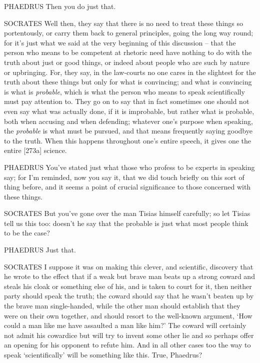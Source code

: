 PHAEDRUS Then you do just that. 

SOCRATES Well then, they say that there is no need to treat these things
so portentously, or carry them back to general principles, going the
long way round; for it's just what we said at the very beginning of this
discussion -- that the person who means to be competent at rhetoric need
have nothing to do  with the truth about just or good things, or
indeed about people who are such by nature or upbringing. For, they say,
in the law-courts no one cares in the slightest for the truth about
these things but only for what is convincing; and what is convincing
 is what is {\em probable}, which is what the person who means
to speak scientifically must pay attention to. They go on to say that in
fact sometimes one should not even say what was actually done, if it is
improbable, but rather what is probable, both when accusing and when
defending; whatever one's purpose when speaking, the {\em probable} is
what must be pursued, and  that means frequently saying goodbye
to the truth. When this happens throughout one's entire speech, it gives
one the entire {[}273a{]} science.

PHAEDRUS You've stated just what those who profess to be experts in
speaking say; for I'm reminded, now you say it, that we did touch
briefly on this sort of thing before, and it seems  a point of
crucial significance to those concerned with these things.

SOCRATES But you've gone over the man Tisias himself carefully; so let
Tisias tell us this too: doesn't he say that the  probable is
just what most people think to be the case?

PHAEDRUS Just that.

SOCRATES I suppose it was on making this clever, and scientific,
discovery that he wrote to the effect that if a weak but brave 
man beats up a strong coward and steals his cloak or something else of
his, and is taken to court for it, then neither party should speak the
truth; the coward should say that he wasn't beaten up by the brave man
single-handed, while the other man should establish that they were on
their own together, and should  resort to the well-known
argument, ‘How could a man like me have assaulted a man like him?' The
coward will certainly not admit his cowardice but will try to invent
some other lie and so perhaps offer an opening for his opponent to
refute him. And in all other cases too the way to speak ‘scientifically'
will  be something like this. True, Phaedrus?

